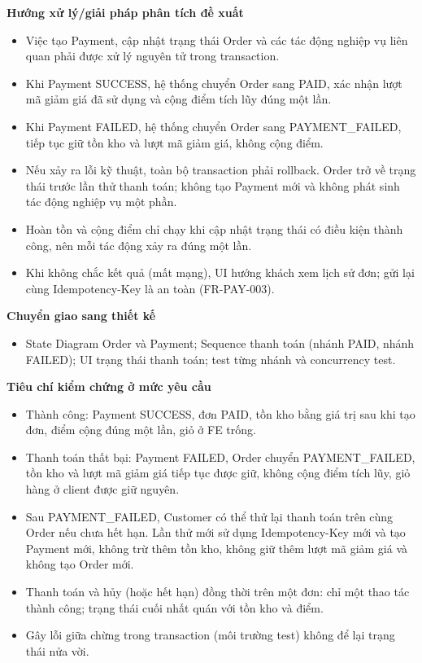\documentclass[11pt,a4paper,oneside]{report}
\begin{document}
\textbf{Hướng xử lý/giải pháp phân tích đề xuất}

\begin{itemize}
\item
  Việc tạo Payment, cập nhật trạng thái Order và các tác động nghiệp vụ liên quan phải được xử lý nguyên tử trong transaction.
\item
  Khi Payment SUCCESS, hệ thống chuyển Order sang PAID, xác nhận lượt mã giảm giá đã sử dụng và cộng điểm tích lũy đúng một lần.
\item
  Khi Payment FAILED, hệ thống chuyển Order sang PAYMENT\_FAILED, tiếp tục giữ tồn kho và lượt mã giảm giá, không cộng điểm.
\item
  Nếu xảy ra lỗi kỹ thuật, toàn bộ transaction phải rollback. Order trở về trạng thái trước lần thử thanh toán; không tạo Payment mới và không phát sinh tác động nghiệp vụ một phần.
\item
  Hoàn tồn và cộng điểm chỉ chạy khi cập nhật trạng thái có điều kiện thành công, nên mỗi tác động xảy ra đúng một lần.
\item
  Khi không chắc kết quả (mất mạng), UI hướng khách xem lịch sử đơn; gửi lại cùng Idempotency-Key là an toàn (FR-PAY-003).
\end{itemize}

\textbf{Chuyển giao sang thiết kế}

\begin{itemize}
\item
  State Diagram Order và Payment; Sequence thanh toán (nhánh PAID, nhánh FAILED); UI trạng thái thanh toán; test từng nhánh và concurrency test.
\end{itemize}

\textbf{Tiêu chí kiểm chứng ở mức yêu cầu}

\begin{itemize}
\item
  Thành công: Payment SUCCESS, đơn PAID, tồn kho bằng giá trị sau khi tạo đơn, điểm cộng đúng một lần, giỏ ở FE trống.
\item
  Thanh toán thất bại: Payment FAILED, Order chuyển PAYMENT\_FAILED, tồn kho và lượt mã giảm giá tiếp tục được giữ, không cộng điểm tích lũy, giỏ hàng ở client được giữ nguyên.
\item
  Sau PAYMENT\_FAILED, Customer có thể thử lại thanh toán trên cùng Order nếu chưa hết hạn. Lần thử mới sử dụng Idempotency-Key mới và tạo Payment mới, không trừ thêm tồn kho, không giữ thêm lượt mã giảm giá và không tạo Order mới.
\item
  Thanh toán và hủy (hoặc hết hạn) đồng thời trên một đơn: chỉ một thao tác thành công; trạng thái cuối nhất quán với tồn kho và điểm.
\item
  Gây lỗi giữa chừng trong transaction (môi trường test) không để lại trạng thái nửa vời.
\end{itemize}
\end{document}
